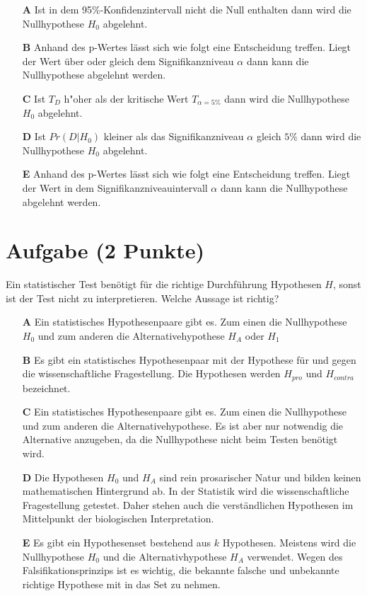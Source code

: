 \documentclass[a4paper, 9pt]{scrartcl}\usepackage[]{graphicx}\usepackage[]{xcolor}
\begin{document}
\begin{enumerate}
\item [\textbf{A} \msquare] Ist in dem 95\%-Konfidenzintervall nicht die Null enthalten dann wird die Nullhypothese $H_0$ abgelehnt.
\item [\textbf{B} \msquare] Anhand des p-Wertes lässt sich wie folgt eine Entscheidung treffen. Liegt der Wert über oder gleich dem Signifikanzniveau $\alpha$ dann kann die Nullhypothese abgelehnt werden.
\item [\textbf{C} \msquare] Ist $T_{D}$ h{"o}her als der kritische Wert $T_{\alpha = 5\%}$ dann wird die Nullhypothese $H_0$ abgelehnt.
\item [\textbf{D} \msquare] Ist $Pr(D|H_0)$ kleiner als das Signifikanzniveau $\alpha$ gleich $5\%$ dann wird die Nullhypothese $H_0$ abgelehnt.
\item [\textbf{E} \msquare] Anhand des p-Wertes lässt sich wie folgt eine Entscheidung treffen. Liegt der Wert in dem Signifikanzniveauintervall $\alpha$ dann kann die Nullhypothese abgelehnt werden.
\end{enumerate}

\section{Aufgabe \hfill (2 Punkte)}



Ein statistischer Test benötigt für die richtige Durchführung Hypothesen $H$, sonst ist der Test nicht zu interpretieren. Welche Aussage ist richtig?



\begin{enumerate}
\item [\textbf{A} \msquare] Ein statistisches Hypothesenpaare gibt es. Zum einen die Nullhypothese $H_0$ und zum anderen die Alternativehypothese $H_A$ oder $H_1$
\item [\textbf{B} \msquare] Es gibt ein statistisches Hypothesenpaar mit der Hypothese für und gegen die wissenschaftliche Fragestellung. Die Hypothesen werden $H_{pro}$ und $H_{contra}$ bezeichnet.
\item [\textbf{C} \msquare] Ein statistisches Hypothesenpaare gibt es. Zum einen die Nullhypothese und zum anderen die Alternativehypothese. Es ist aber nur notwendig die Alternative anzugeben, da die Nullhypothese nicht beim Testen benötigt wird.
\item [\textbf{D} \msquare] Die Hypothesen $H_0$ und $H_A$ sind rein prosarischer Natur und bilden keinen mathematischen Hintergrund ab. In der Statistik wird die wissenschaftliche Fragestellung getestet. Daher stehen auch die verständlichen Hypothesen im Mittelpunkt der biologischen Interpretation.
\item [\textbf{E} \msquare] Es gibt ein Hypothesenset bestehend aus $k$ Hypothesen. Meistens wird die Nullhypothese $H_0$ und die Alternativhypothese $H_A$ verwendet. Wegen des Falsifikationsprinzips ist es wichtig, die bekannte falsche und unbekannte richtige Hypothese mit in das Set zu nehmen.
\end{enumerate}
\end{document}
